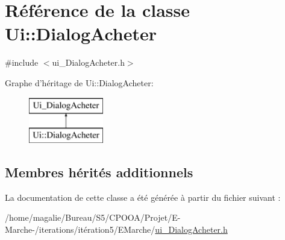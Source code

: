\hypertarget{class_ui_1_1_dialog_acheter}{\section{Référence de la classe Ui\-:\-:Dialog\-Acheter}
\label{class_ui_1_1_dialog_acheter}
}


{\ttfamily \#include $<$ui\-\_\-\-Dialog\-Acheter.\-h$>$}

Graphe d'héritage de Ui\-:\-:Dialog\-Acheter\-:\begin{figure}[H]
\begin{center}
\leavevmode
\includegraphics[height=2.000000cm]{class_ui_1_1_dialog_acheter}
\end{center}
\end{figure}
\subsection*{Membres hérités additionnels}


La documentation de cette classe a été générée à partir du fichier suivant \-:\begin{DoxyCompactItemize}
\item 
/home/magalie/\-Bureau/\-S5/\-C\-P\-O\-O\-A/\-Projet/\-E-\/\-Marche-\//iterations/itération5/\-E\-Marche/\hyperlink{ui___dialog_acheter_8h}{ui\-\_\-\-Dialog\-Acheter.\-h}\end{DoxyCompactItemize}
